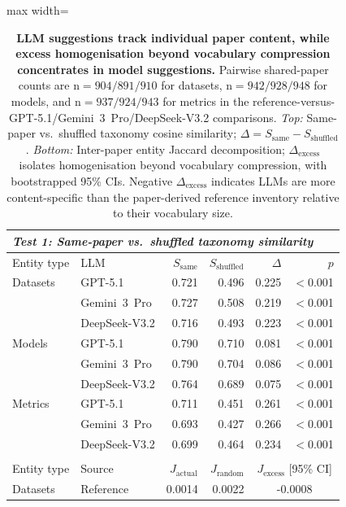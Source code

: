 \begin{table}[H]
\centering
\caption{\textbf{LLM suggestions track individual paper content, while excess homogenisation beyond vocabulary compression concentrates in model suggestions.} Pairwise shared-paper counts are n$=904/891/910$ for datasets, n$=942/928/948$ for models, and n$=937/924/943$ for metrics in the reference-versus-GPT-5.1/Gemini~3~Pro/DeepSeek-V3.2 comparisons. \textit{Top:} Same-paper vs.\ shuffled taxonomy cosine similarity; $\Delta = S_{\mathrm{same}} - S_{\mathrm{shuffled}}$. \textit{Bottom:} Inter-paper entity Jaccard decomposition; $\Delta_{\mathrm{excess}}$ isolates homogenisation beyond vocabulary compression, with bootstrapped 95\% CIs. Negative $\Delta_{\mathrm{excess}}$ indicates LLMs are more content-specific than the paper-derived reference inventory relative to their vocabulary size.}
\label{tab:content_sensitivity}
\begin{adjustbox}{max width=\textwidth}
\footnotesize
\begin{tabular}{llrrrr}
\toprule
\multicolumn{6}{l}{\textit{Test 1: Same-paper vs.\ shuffled taxonomy similarity}} \\
\midrule
Entity type & LLM & $S_{\mathrm{same}}$ & $S_{\mathrm{shuffled}}$ & $\Delta$ & $p$ \\
\midrule
Datasets & GPT-5.1 & 0.721 & 0.496 & 0.225 & $<$0.001 \\
 & Gemini~3~Pro & 0.727 & 0.508 & 0.219 & $<$0.001 \\
 & DeepSeek-V3.2 & 0.716 & 0.493 & 0.223 & $<$0.001 \\
Models & GPT-5.1 & 0.790 & 0.710 & 0.081 & $<$0.001 \\
 & Gemini~3~Pro & 0.790 & 0.704 & 0.086 & $<$0.001 \\
 & DeepSeek-V3.2 & 0.764 & 0.689 & 0.075 & $<$0.001 \\
Metrics & GPT-5.1 & 0.711 & 0.451 & 0.261 & $<$0.001 \\
 & Gemini~3~Pro & 0.693 & 0.427 & 0.266 & $<$0.001 \\
 & DeepSeek-V3.2 & 0.699 & 0.464 & 0.234 & $<$0.001 \\
\midrule
\addlinespace
\multicolumn{6}{l}{\textit{Test 2: Inter-paper entity Jaccard decomposition}} \\
\midrule
Entity type & Source & $J_{\mathrm{actual}}$ & $J_{\mathrm{random}}$ & \multicolumn{2}{c}{$J_{\mathrm{excess}}$ [95\% CI]} \\
\midrule
Datasets & Reference & 0.0014 & 0.0022 & \multicolumn{2}{c}{-0.0008} \\

\end{tabular}
\end{adjustbox}
\end{table}
